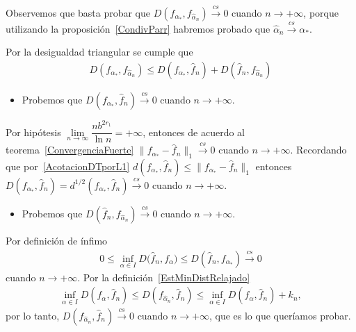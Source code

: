 \begin{dem}
	
	Observemos que basta probar que $D(f_{\alpha_{*}},f_{\widehat{\alpha}_n}) \stackrel{cs}{\longrightarrow} 0$ cuando $n \longrightarrow +\infty$, porque utilizando la proposición~\ref{CondivParr} habremos probado que $\widehat{\alpha}_n \stackrel{cs}{\longrightarrow} \alpha_{*}.$
	
    Por la desigualdad triangular se cumple que
	\begin{align}
	D(f_{\alpha_{*}},f_{\widehat{\alpha}_n}) \leq D(f_{\alpha_{*}},\widehat{f}_n)+D(\widehat{f}_n,f_{\widehat{\alpha}_n})
	\end{align}
\begin{itemize}
	\item Probemos que $D(f_{\alpha_{*}},\widehat{f}_n) \stackrel{cs}{\longrightarrow} 0$ cuando $n \to +\infty$.
\end{itemize}
	
	Por hipótesis $\lim\limits_{n \to \infty} \dfrac{n b^{2r_1}}{\ln{n}}  = +\infty $, entonces de acuerdo al teorema~\ref{ConvergenciaFuerte} $\parallel f_{\alpha_{*}} -\widehat{f}_n\parallel_1 \stackrel{cs}{\longrightarrow} 0$ cuando $n \to +\infty$. Recordando que por~\eqref{AcotacionDTporL1} $d(f_{\alpha_{*}},\widehat{f}_n) \leq \parallel f_{\alpha_{*}} -\widehat{f}_n\parallel_1$ entonces $D(f_{\alpha_{*}},\widehat{f}_n)=d^{1/2}(f_{\alpha_{*}},\widehat{f}_n) \stackrel{cs}{\longrightarrow} 0$ cuando $n \to +\infty$. 

\begin{itemize}
	\item Probemos que $D(\widehat{f}_n,f_{\widehat{\alpha}_n}) \stackrel{cs}{\longrightarrow} 0$ cuando $n \to +\infty$.
\end{itemize}

Por definición de ínfimo %
\begin{align*}
0 \leq \inf_{\alpha\in I} D{(\widehat{f}_{n},f_{\alpha}}) \leq  D(\widehat{f}_{n},f_{\alpha_{*}})\stackrel{cs}{\longrightarrow} 0
\end{align*}
cuando $n\to +\infty$.
Por la definición~\ref{EstMinDistRelajado}
\begin{align}
\label{EstMinDistRelajado2}
\inf\limits_{\alpha \in I}D(f_{{\alpha}},\widehat{f}_n) \leq D(f_{\widehat{\alpha}_{n}},\widehat{f}_n) \leq \inf\limits_{\alpha \in I}D(f_{{\alpha}},\widehat{f}_n) + k_n,
\end{align}
por lo tanto, $D(f_{\widehat{\alpha}_{n}},\widehat{f}_n) \stackrel{cs}{\longrightarrow} 0$ cuando $n \to +\infty$, que es lo que queríamos probar.
\end{dem}

